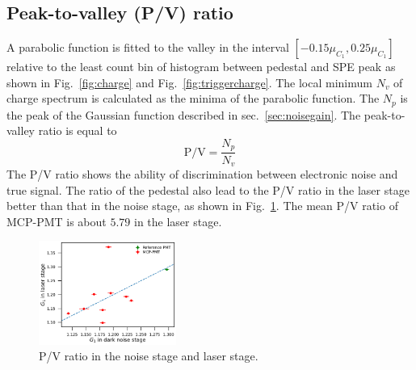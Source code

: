 \subsection{Peak-to-valley (P/V) ratio}
A parabolic function is fitted to the valley in the interval $[-0.15\mu_{C_1}, 0.25\mu_{C_1}]$ relative to the least count bin of histogram between pedestal and SPE peak as shown in Fig.~\ref{fig:charge} and Fig.~\ref{fig:triggercharge}. The local minimum $N_v$ of charge spectrum is calculated as the minima of the parabolic function. The $N_p$ is the peak of the Gaussian function described in sec.~\ref{sec:noisegain}. The peak-to-valley ratio is equal to  
\begin{equation}
    \mathrm{P/V}=\frac{N_p}{N_v}
\end{equation}
The P/V ratio shows the ability of discrimination between electronic noise and true signal. The ratio of the pedestal also lead to the P/V ratio in the laser stage better than that in the noise stage, as shown in Fig.~\ref{fig:PVCompare}. The mean P/V ratio of MCP-PMT is about $5.79$ in the laser stage.
\begin{figure}[!htbp]
    \centering
    \includegraphics[width=0.4\textwidth,page=6]{figures/result/compare.pdf}
    \caption{P/V ratio in the noise stage and laser stage.} 
    \label{fig:PVCompare}
\end{figure}

